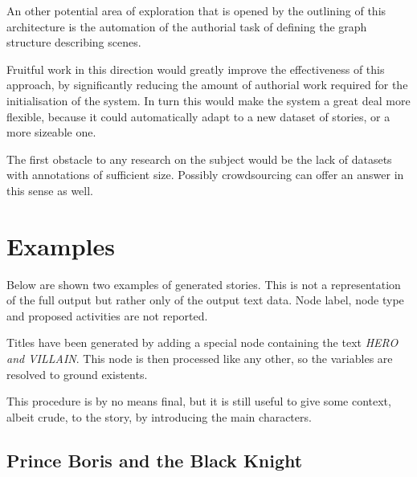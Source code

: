 \documentclass[12pt,a4paper,oneside]{report}
\begin{document}
\bigskip

An other potential area of exploration that is opened by the outlining of this architecture is the automation of the authorial task of defining the graph structure describing scenes.

Fruitful work in this direction would greatly improve the effectiveness of this approach, by significantly reducing the amount of authorial work required for the initialisation of the system. In turn this would make the system a great deal more flexible, because it could automatically adapt to a new dataset of stories, or a more sizeable one.

The first obstacle to any research on the subject would be the lack of datasets with annotations of sufficient size. Possibly crowdsourcing can offer an answer in this sense as well.

\appendix

\chapter{Examples}
Below are shown two examples of generated stories. This is not a representation of the full output but rather only of the output text data. Node label, node type and proposed activities are not reported.

Titles have been generated by adding a special node containing the text \textit{HERO and VILLAIN}. This node is then processed like any other, so the variables are resolved to ground existents.

This procedure is by no means final, but it is still useful to give some context, albeit crude, to the story, by introducing the main characters.

\section{Prince Boris and the Black Knight}
\end{document}
